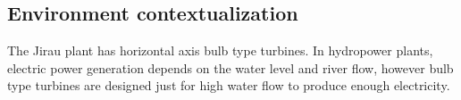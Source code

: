 \subsection{Environment contextualization}\label{sec::desc_contex}

The Jirau plant has horizontal axis bulb type turbines. In hydropower
plants, electric power generation depends on the water level and river flow,
however bulb type turbines are designed just for high water flow to produce
enough electricity. %
 


